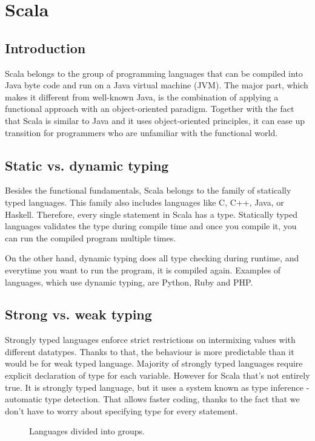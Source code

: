 \section{Scala}
\subsection{Introduction}
Scala belongs to the group of programming languages that can be compiled into Java byte code and run on a Java virtual machine (JVM). The major part, which makes it different from well-known Java, is the combination of applying a functional approach with an object-oriented paradigm. Together with the fact that Scala is similar to Java and it uses object-oriented principles, it can ease up transition for programmers who are unfamiliar with the functional world.

\subsection{Static vs. dynamic typing}
Besides the functional fundamentals, Scala belongs to the family of statically typed languages. This family also includes languages like C, C++, Java, or Haskell. Therefore, every single statement in Scala has a type.\cite{Scala static} Statically typed languages validates the type during compile time and once you compile it, you can run the compiled program multiple times.

On the other hand, dynamic typing does all type checking during runtime, and everytime you want to run the program, it is compiled again. Examples of languages, which use dynamic typing, are Python, Ruby and PHP.

\subsection{Strong vs. weak typing}
Strongly typed languages enforce strict restrictions on intermixing values with different datatypes. Thanks to that, the behaviour is more predictable than it would be for weak typed language. Majority of strongly typed languages require explicit declaration of type for each variable. However for Scala that's not entirely true. It is strongly typed language, but it uses a system known as type inference - automatic type detection. That allows faster coding, thanks to the fact that we don’t have to worry about specifying type for every statement. 

\begin{figure}[h]
  \caption {Languages divided into groups.\cite{Typing image}}
\end{figure}

